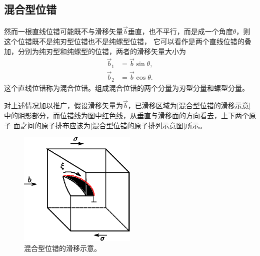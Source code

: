             \subsection{混合型位错}
                然而一根直线位错可能既不与滑移矢量$\vec{b}$垂直，也不平行，而是成一个角度$\theta$，则这个位错既不是纯刃型位错也不是纯螺型位错，
                它可以看作是两个直线位错的叠加，分别为纯刃型和纯螺型的位错，两者的滑移矢量大小为
                \begin{align}
                    \vec{b}_1&=\vec{b}\sin\theta,\\
                    \vec{b}_2&=\vec{b}\cos\theta.
                \end{align}
                这个直线位错称为混合位错。组成混合位错的两个分量为刃型分量和螺型分量。

                对上述情况加以推广，假设滑移矢量为$\vec{b}$，已滑移区域为\autoref{混合型位错的滑移示意}中的阴影部分，而位错线为图中红色线，从垂直与滑移面的方向看去，上下两个原子
                面之间的原子排布应该为\autoref{混合型位错的原子排列示意图}所示。
                \begin{figure}[ht]
                    \centering
                    \includegraphics[width=0.5\textwidth]{fig/slip_of_mixed_dislocations.eps}
                    \caption{混合型位错的滑移示意。}
                    \label{混合型位错的滑移示意}
                \end{figure}
                
